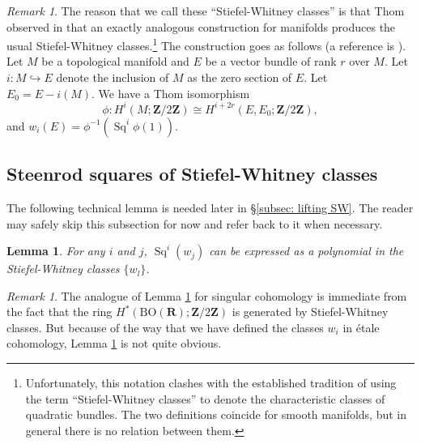 \documentclass[10pt, reqno]{amsart}
\numberwithin{equation}{subsection}
\newcommand{\Z}{\mathbf{Z}}
\newcommand{\R}{\mathbf{R}}
\newcommand{\mrm}[1]{\mathrm{#1}}
\DeclareMathOperator{\Sq}{Sq}
\newtheorem{lemma}[thm]{Lemma}
\theoremstyle{remark}
\newtheorem{remark}[thm]{Remark}
\begin{document}
\begin{remark}
The reason that we call these ``Stiefel-Whitney classes'' is that Thom observed in \cite{Thom51} that an exactly analogous construction for manifolds produces the usual Stiefel-Whitney classes.\footnote{Unfortunately, this notation clashes with the established tradition of using the term ``Stiefel-Whitney classes'' to denote the characteristic classes of quadratic bundles. The two definitions coincide for smooth manifolds, but in general there is no relation between them.} The construction goes as follows (a reference is \cite[\S 8]{MS74}). Let $M$ be a topological manifold and $E$ be a vector bundle of rank $r$ over $M$. Let $i \colon M \hookrightarrow E$ denote the inclusion of $M$ as the zero section of $E$. Let $E_0 = E - i(M)$. We have a Thom isomorphism 
\[
\phi \colon H^i(M; \Z/2\Z) \cong  H^{i+2r} (E, E_0; \Z/2\Z),
\]
and $w_i (E) = \phi^{-1} (\Sq^i \phi(1))$. 


\end{remark}


\subsection{Steenrod squares of Stiefel-Whitney classes}\label{app: A}

The following technical lemma is needed later in \S \ref{subsec: lifting SW}. The reader may safely skip this subsection for now and refer back to it when necessary. 

\begin{lemma}\label{lem: squares of SW classes}
For any $i$ and $j$, $\Sq^i(w_j)$ can be expressed as a polynomial in the Stiefel-Whitney classes $\{w_l\}$.
\end{lemma}

\begin{remark}
The analogue of Lemma \ref{lem: squares of SW classes} for singular cohomology is immediate from the fact that the ring $H^*(\mrm{BO}(\R); \Z/2\Z)$ is generated by Stiefel-Whitney classes. But because of the way that we have defined the classes $w_i$ in \'{e}tale cohomology, Lemma \ref{lem: squares of SW classes} is not quite obvious. 
\end{remark}
\end{document}
